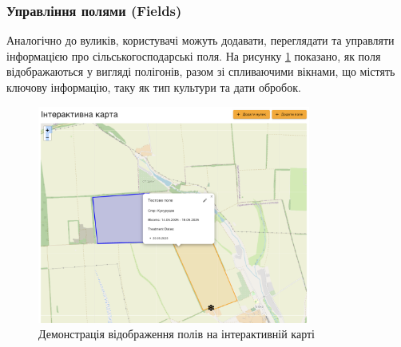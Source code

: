 \subsubsection{Управління полями (Fields)}
Аналогічно до вуликів, користувачі можуть додавати, переглядати та управляти інформацією про сільськогосподарські поля. На рисунку \ref{fig:map_fields_demo} показано, як поля відображаються у вигляді полігонів, разом зі спливаючими вікнами, що містять ключову інформацію, таку як тип культури та дати обробок.

\begin{figure}[htbp]
    \centering
    \includegraphics[width=0.8\textwidth]{practice_report/images/map_fields_demo.png}
    \caption{Демонстрація відображення полів на інтерактивній карті}
    \label{fig:map_fields_demo}
\end{figure}

